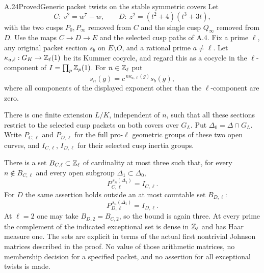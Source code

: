 \begin{statement}{A.24}{Proved}{Generic packet twists on the stable symmetric covers}
Let
\[
 C:\ v^2=w^7-w,\qquad
 D:\ z^2=(t^2+4)(t^3+3t),
\]
with the two cusps $P_0,P_\infty$ removed from $C$ and the single
cusp $Q_\infty$ removed from $D$. Use the maps
$C\to D\to E$ and the selected cusp paths of A.4. Fix a prime
$\ell$, any original packet section $s_b$ on $E\setminus O$,
and a rational prime $a\ne\ell$. Let
$\kappa_{a,\ell}:G_K\to\mathbb Z_\ell(1)$ be its Kummer cocycle, and
regard this as a cocycle in the $\ell$-component of
$I=\prod_p\mathbb Z_p(1)$. For $n\in\mathbb Z_\ell$ put
\[
 s_n(g)=c^{\,n\kappa_{a,\ell}(g)}s_b(g),
                                                        \tag{A.24.1}
\]
where all components of the displayed exponent other than the
$\ell$-component are zero.

There is one finite extension $L/K$, independent of $n$, such
that all these sections restrict to the selected cusp packets
on both covers over $G_L$. Put $\Delta_0=\Delta\cap G_L$.
Write $P_{C,\ell}$ and $P_{D,\ell}$ for the full pro-$\ell$
geometric groups of these two open curves, and $I_{C,\ell}$,
$I_{D,\ell}$ for their selected cusp inertia groups.

There is a set $B_{C,\ell}\subset\mathbb Z_\ell$ of cardinality at most
three such that, for every $n\notin B_{C,\ell}$ and every open
subgroup $\Delta_1\subset\Delta_0$,
\[
             P_{C,\ell}^{\,s_n(\Delta_1)}=I_{C,\ell}.
                                                        \tag{A.24.2}
\]
For $D$ the same assertion holds outside an at most countable
set $B_{D,\ell}$:
\[
             P_{D,\ell}^{\,s_n(\Delta_1)}=I_{D,\ell}.
                                                        \tag{A.24.3}
\]
At $\ell=2$ one may take $B_{D,2}=B_{C,2}$, so the bound is
again three. At every prime the complement of the indicated
exceptional set is dense in $\mathbb Z_\ell$ and has Haar measure one.
The sets are explicit in terms of the actual first nontrivial
Johnson matrices described in the proof. No value of those
arithmetic matrices, no membership decision for a specified
packet, and no assertion for all exceptional twists is made.
\end{statement}
